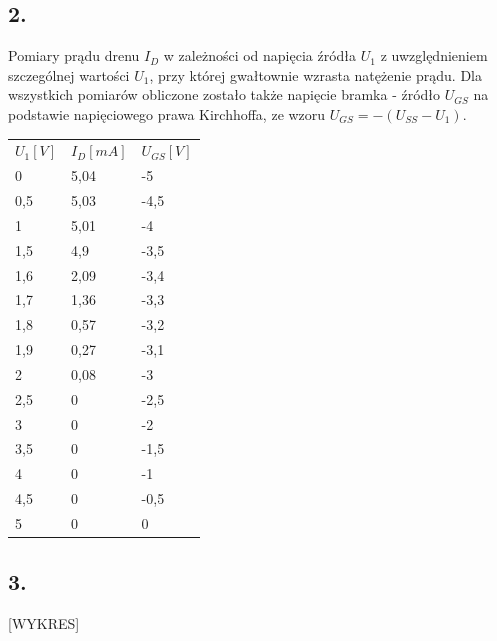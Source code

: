 \documentclass[polish,a4paper]{article}
\begin{document}
\subsection*{2.}


Pomiary prądu drenu $I_D$ w zależności od napięcia źródła $U_{1}$ z uwzględnieniem szczególnej wartości $U_{1}$, przy której gwałtownie wzrasta natężenie prądu. Dla wszystkich pomiarów obliczone zostało także napięcie bramka - źródło $U_{GS}$ na podstawie napięciowego prawa Kirchhoffa, ze wzoru $U_{GS}=-(U_{SS}-U_1)$.

\begin{center}
\begin{tabular}{|l|l|l|}
\hline
\textbf{$U_1 [V]$} & \textbf{$I_D [mA]$} & \textbf{$U_{GS} [V]$}\\
\hhline{|=|=|=|}
0 & 5,04 & -5\\
\hline
0,5 & 5,03 & -4,5\\
\hline
1 & 5,01 & -4\\
\hline
1,5 & 4,9 & -3,5\\
\hline
1,6 & 2,09 & -3,4\\
\hline
1,7 & 1,36 & -3,3\\
\hline
1,8 & 0,57 & -3,2\\
\hline
1,9 & 0,27 & -3,1\\
\hline
2 & 0,08 & -3\\
\hline
2,5 & 0 & -2,5\\
\hline
3 & 0 & -2\\
\hline
3,5 & 0 & -1,5\\
\hline
4 & 0 & -1\\
\hline
4,5 & 0 & -0,5\\
\hline
5 & 0 & 0\\
\hline



\end{tabular}
\end{center}

\subsection*{3.} 
[WYKRES]
\end{document}
